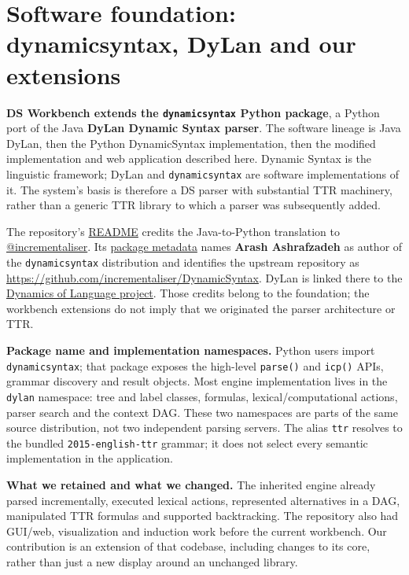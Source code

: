 \documentclass[11pt,a4paper]{article}
\begin{document}
\section{Software foundation: dynamicsyntax, DyLan and our
extensions}\label{software-foundation-dynamicsyntax-dylan-and-our-extensions}

\textbf{DS Workbench extends the \texttt{dynamicsyntax} Python package},
a Python port of the Java \textbf{DyLan Dynamic Syntax parser}. The
software lineage is Java DyLan, then the Python DynamicSyntax
implementation, then the modified implementation and web application
described here. Dynamic Syntax is the linguistic framework; DyLan and
\texttt{dynamicsyntax} are software implementations of it. The system's
basis is therefore a DS parser with substantial TTR machinery, rather
than a generic TTR library to which a parser was subsequently added.

The repository's \href{../README.md}{README} credits the Java-to-Python
translation to
\href{https://github.com/incrementaliser}{@incrementaliser}. Its
\href{../pyproject.toml}{package metadata} names \textbf{Arash
Ashrafzadeh} as author of the \texttt{dynamicsyntax} distribution and
identifies the upstream repository as
\url{https://github.com/incrementaliser/DynamicSyntax}. DyLan is linked
there to the \href{https://github.com/Dynamics-of-Language}{Dynamics of
Language project}. Those credits belong to the foundation; the workbench
extensions do not imply that we originated the parser architecture or
TTR.

\textbf{Package name and implementation namespaces.} Python users import
\texttt{dynamicsyntax}; that package exposes the high-level
\texttt{parse()} and \texttt{icp()} APIs, grammar discovery and result
objects. Most engine implementation lives in the \texttt{dylan}
namespace: tree and label classes, formulas, lexical/computational
actions, parser search and the context DAG. These two namespaces are
parts of the same source distribution, not two independent parsing
servers. The alias \texttt{ttr} resolves to the bundled
\texttt{2015-english-ttr} grammar; it does not select every semantic
implementation in the application.

\textbf{What we retained and what we changed.} The inherited engine
already parsed incrementally, executed lexical actions, represented
alternatives in a DAG, manipulated TTR formulas and supported
backtracking. The repository also had GUI/web, visualization and
induction work before the current workbench. Our contribution is an
extension of that codebase, including changes to its core, rather than
just a new display around an unchanged library.
\end{document}
